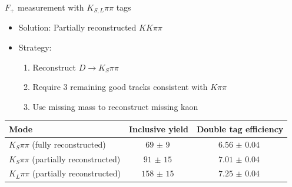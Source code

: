 \documentclass{beamer}
\begin{document}
\begin{frame}{$F_+$ measurement with $K_{S, L}\pi\pi$ tags}
  \begin{itemize}
    \setlength\itemsep{1.0em}
    \item{Solution: Partially reconstructed $KK\pi\pi$}
    \item{Strategy:}
    \begin{enumerate}
      \setlength\itemsep{0.5em}
      \item{Reconstruct $D\to K_S\pi\pi$}
      \item{Require 3 remaining good tracks consistent with $K\pi\pi$}
      \item{Use missing mass to reconstruct missing kaon}
    \end{enumerate}
  \end{itemize}
  \vspace{0.5cm}
  \def\arraystretch{1.2}%
  \begin{tabular}{lcc}
    Mode                                     & Inclusive yield  & Double tag efficiency \\
    \hline
    $K_S\pi\pi$ (fully reconstructed)        & $\SI{69(9)}{}$   & $\SI{6.56(4)}{}$ \\
    $K_S\pi\pi$ (partially reconstructed)    & $\SI{91(15)}{}$  & $\SI{7.01(4)}{}$ \\
    $K_L\pi\pi$ (partially reconstructed)    & $\SI{158(15)}{}$ & $\SI{7.25(4)}{}$ \\
    \hline
  \end{tabular}
\end{frame}
\end{document}
